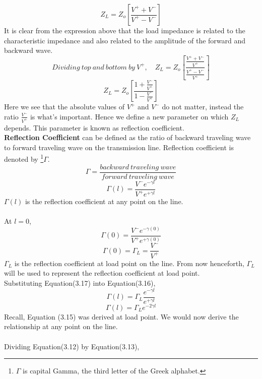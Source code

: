 \begin{equation}
Z_L = Z_o \left[ \frac{V^+ + V^-}{V^+ - V^-} \right]
\end{equation}
It is clear from the expression above that the load impedance is related to the characteristic impedance and also related to the amplitude of the forward and backward wave. 
\begin{equation*}
Dividing\ top\ and\ bottom\ by\ V^+,\quad
Z_L = Z_o\left[ \frac{\frac{V^+ + V^-}{V^+}}{\frac{V^+ - V^-}{V^+}}\right] 
\end{equation*}
\begin{equation}
Z_L = Z_o\left[ \frac{1+ \frac{V^-}{V^+}}{1 - \frac{V^-}{V^+}}\right] 
\end{equation}
Here we see that the absolute values of $V^+$ and $V^-$ do not matter, instead the ratio $\frac{V^-}{V^+}$ is what's important. Hence we define a new parameter on which $Z_L$ depends. This parameter is known as reflection coefficient.\\ \textbf{Reflection Coefficient} can be defined as the ratio of backward traveling wave to forward traveling wave on the transmission line.
Reflection coefficient is denoted by \footnote[3]{$\Gamma$ is capital Gamma, the third letter of the Greek alphabet.}$\Gamma$.
\begin{equation*}
\Gamma = \frac{backward\ traveling\ wave}{forward\ traveling\ wave}
\end{equation*}
\begin{equation}
\Gamma (l) = \frac{V^-e^{-\gamma l}}{V^+e^{+\gamma l}}
\end{equation}
 $\Gamma(l)$ is the reflection coefficient at any point on the line.\\ \\
At $l = 0$,
\begin{equation*}
\Gamma (0) = \frac{V^-e^{-\gamma (0)}}{V^+e^{+\gamma (0)}}
\end{equation*}
\begin{equation}
\Gamma (0) = \Gamma_L = \frac{V^-}{V^+}
\end{equation}
 $\Gamma_L$ is the reflection coefficient at load point on the line. From now henceforth, $\Gamma_L$ will be used to represent the reflection coefficient at load point.\\
 Substituting Equation(3.17) into Equation(3.16),
 \begin{equation*}
 \Gamma (l) = \Gamma_L\frac{e^{-\gamma l}}{e^{+\gamma l}}
 \end{equation*}
  \begin{equation}
 \Gamma (l) = \Gamma_L e^{-2\gamma l}
 \end{equation}
Recall, Equation (3.15) was derived at load point. We would now derive the relationship at any point on the line. \\ \\
Dividing Equation(3.12) by Equation(3.13),

